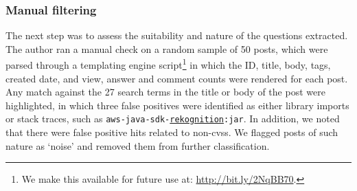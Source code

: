 \subsubsection{Manual filtering}
\label{semotion2020:ssec:method:filtering:automated-manual-filtering}

The next step was to assess the suitability and nature of the \SEMNumPostsFromSO{} questions extracted. The \alexnumauthor{} author ran a manual check on a random sample of 50 posts, which were parsed through a templating engine script\footnote{We make this available for future use at: \url{http://bit.ly/2NqBB70}.} in which the ID, title, body, tags, created date, and view, answer and comment counts were rendered for each post.
Any match against the 27 search terms in the title or body of the post were highlighted, in which three false positives were identified as either library imports or stack traces, such as \texttt{aws-java-sdk-\uline{rekognition}:jar}. In addition, we noted that there were false positive hits related to non-\glspl{cvs}. We flagged posts of such nature as `noise' and removed them from further classification.

